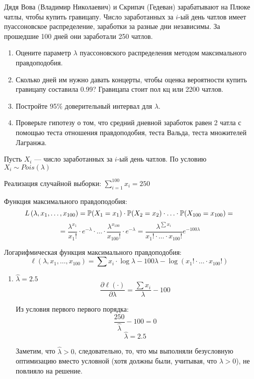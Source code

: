 \begin{problem}
Дядя Вова (Владимир Николаевич) и Скрипач (Гедеван) зарабатывают на Плюке чатлы, чтобы купить гравицапу. Число заработанных за $i$-ый день чатлов имеет пуассоновское распределение, заработки за разные дни независимы. За прошедшие 100 дней они заработали 250 чатлов.
\begin{enumerate}
\item Оцените параметр $\lambda$ пуассоновского распределения методом максимального правдоподобия.
\item Сколько дней им нужно давать концерты, чтобы оценка вероятности купить гравицапу составила 0.99? Гравицапа стоит пол кц или 2200 чатлов.
\item Постройте 95\% доверительный интервал для $\lambda$.
\item Проверьте гипотезу о том, что средний дневной заработок равен 2 чатла с помощью теста отношения правдоподобия, теста Вальда, теста множителей Лагранжа.
\end{enumerate}

\begin{sol}

Пусть \(X_i\) — число заработанных за \(i\)-ый день чатлов. По условию \(X_i \sim Pois (\lambda) \)

Реализация случайной выборки: \(\sum_{i = 1}^{100} x_i = 250 \)

Функция максимального правдоподобия:
\[  L\left(\lambda, x_1, \ldots, x_{100}\right) = \P (X_1 = x_1) \cdot \P (X_2 = x_2) \cdot \ldots \cdot \P (X_{100} = x_{100} )= \]
\[ =\frac{\lambda^{x_1}}{x_1 !} \cdot e^{-\lambda} \cdot \ldots \cdot \frac{\lambda^{x_{100}}}{x_{100}!} \cdot e^{-\lambda} = \frac{\lambda^{\sum x_i}}{x_1!\cdot \ldots \cdot x_{100}!} e^{-100\lambda}\]

Логарифмическая функция максимального правдоподобия:
\[ \ell\left(\lambda, x_1, \ldots, x_{100} \right) = \sum x_i \cdot \log \lambda - 100 \lambda - \log \left(x_1!\cdot \ldots \cdot x_{100}! \right)\]

\begin{enumerate}
\item \( \hat{\lambda} = 2.5\)
\[ \frac{\partial \ell (\cdot)}{\partial \lambda} = \frac{\sum x_i}{\lambda} - 100\]

Из условия первого первого порядка:
\[ \frac{250}{\hat{\lambda}} - 100 = 0\]
\[ \hat{\lambda} = 2.5\]

Заметим, что \( \hat{\lambda} >0 \), следовательно, то, что мы выполняли безусловную оптимизацию вместо условной (хотя должны были, учитывая, что \(\lambda > 0\)), не повлияло на решение.



\end{enumerate}
\end{sol}
\end{problem}
